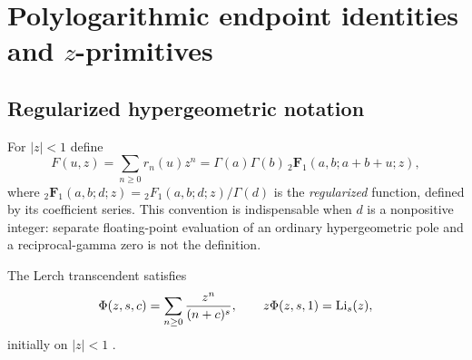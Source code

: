 \section{Polylogarithmic endpoint identities and \texorpdfstring{$z$}{z}-primitives}\label{sec:polylog}

\subsection{Regularized hypergeometric notation}
For $|z|<1$ define
\begin{equation}\label{eq:F}
 F(u,z)=\sum_{n\ge0}r_n(u)z^n
 =\Gamma(a)\Gamma(b)\,{}_2\mathbf F_1(a,b;a+b+u;z),
\end{equation}
where ${}_2\mathbf F_1(a,b;d;z)={}_2F_1(a,b;d;z)/\Gamma(d)$
is the \emph{regularized} function, defined by its coefficient series.
This convention is indispensable when $d$ is a nonpositive integer:
separate floating-point evaluation of an ordinary hypergeometric pole and
a reciprocal-gamma zero is not the definition.

The Lerch transcendent satisfies
\begin{equation}\label{eq:Lerch}
 \Phi(z,s,c)=\sum_{n\ge0}\frac{z^n}{(n+c)^s},\qquad
 z\Phi(z,s,1)=\operatorname{Li}_s(z),
\end{equation}
initially on $|z|<1$ \cite{dlmf-lerch}.

